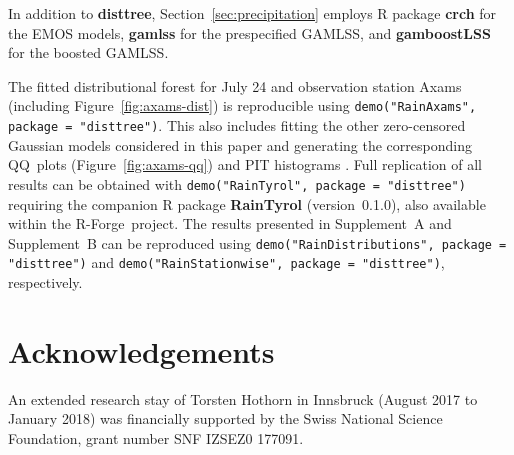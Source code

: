 \documentclass[aoas, preprint]{imsart}
\numberwithin{equation}{subsection}
\begin{document}
In addition to \textbf{disttree}, Section~\ref{sec:precipitation} employs
\textsf{R} package \textbf{crch}  
\citep[version~1.0.1]{Messner+Mayr+Zeileis:2016} for the EMOS 
models, \textbf{gamlss}
\citep[version~5.1.0]{Stasinopoulos+Rigby:2007} for the 
prespecified GAMLSS, and \textbf{gamboostLSS}
\citep[version~2.0.1]{Hofner+Mayr+Schmid:2016} for the boosted GAMLSS.

The fitted distributional forest for July 24 and
observation station Axams (including Figure~\ref{fig:axams-dist})
is reproducible using \texttt{demo("RainAxams", package = "disttree")}.
This also includes fitting the other zero-censored
Gaussian models considered in this paper and generating the corresponding 
QQ~plots (Figure~\ref{fig:axams-qq}) and PIT histograms 
\citep[Supplement~B]{Schlosser+Hothorn+Stauffer:2019b}.
Full replication of all results can be obtained with
\texttt{demo("RainTyrol", package = "disttree")}
requiring the companion \textsf{R} package \textbf{RainTyrol} 
(version~0.1.0),
also available within the \textsf{R}-Forge~project.
The results presented in Supplement~A \citep{Schlosser+Hothorn+Stauffer:2019a} and 
Supplement~B \citep{Schlosser+Hothorn+Stauffer:2019b} can be reproduced using
\texttt{demo("RainDistributions", package = "disttree")} and 
\texttt{demo("RainStationwise", package = "disttree")}, respectively.


\section*{Acknowledgements}
An extended research stay of Torsten Hothorn in Innsbruck (August
2017 to January 2018) was financially supported by the Swiss National
Science Foundation, grant number SNF IZSEZ0 177091.
\end{document}
